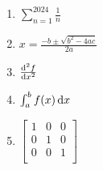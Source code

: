 \begin{enumerate}
    \item $\sum_{n=1}^{2024}\frac{1}{n}$
    \item $x=\frac{-b \pm \sqrt{b^2-4ac}}{2a}$
    \item $\od[2]{f}{x}$ %
    
    \item $\int_a^b f(x) \dif x$  %
    
    \item $
        \begin{bmatrix}
            1 & 0 & 0\\
            0 & 1 & 0\\
            0 & 0 & 1\\
        \end{bmatrix}
        $
\end{enumerate}